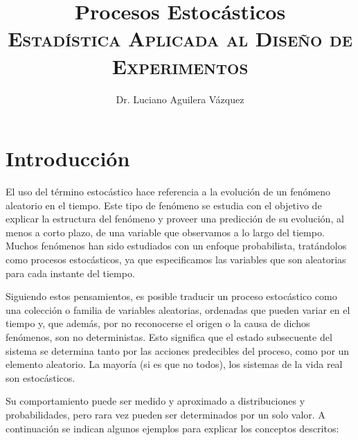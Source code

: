 \documentclass[11 pts, letterpaper, twosided]{article}
\title{Procesos Estocásticos\\
      {\normalsize \textsc{Estadística Aplicada al Diseño de Experimentos}}}
\author{Dr. Luciano Aguilera Vázquez}
\begin{document}
\maketitle

\section{Introducción}

El uso del término estocástico hace referencia a la evolución de un
fenómeno aleatorio en el tiempo. Este tipo de fenómeno se estudia con
el objetivo de explicar la estructura del fenómeno y proveer una
predicción de su evolución, al menos a corto plazo, de una variable
que observamos a lo largo del tiempo. Muchos fenómenos han sido
estudiados con un enfoque probabilista, tratándolos como procesos
estocásticos, ya que especificamos las variables que son aleatorias
para cada instante del tiempo.

Siguiendo estos pensamientos, es posible traducir un proceso
estocástico como una colección o familia de variables aleatorias,
ordenadas que pueden variar en el tiempo y, que además, por no
reconocerse el origen o la causa de dichos fenómenos, son no
deterministas.  Esto significa que el estado subsecuente del sistema
se determina tanto por las acciones predecibles del proceso, como por
un elemento aleatorio. La mayoría (si es que no todos), los sistemas
de la vida real son estocásticos.

Su comportamiento puede ser medido y aproximado a distribuciones y
probabilidades, pero rara vez pueden ser determinados por un solo
valor. A continuación se indican algunos ejemplos para explicar los
conceptos descritos:
\end{document}
